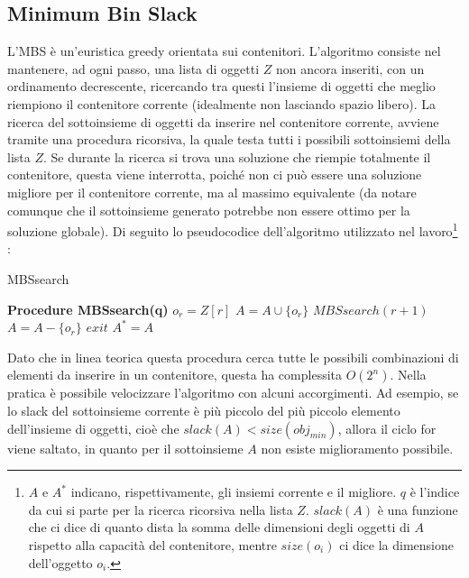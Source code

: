 \documentclass{article}
\begin{document}
\subsection{Minimum Bin Slack}
L'MBS è un'euristica greedy orientata sui contenitori. L'algoritmo consiste nel mantenere, ad ogni passo, una lista di oggetti $Z$ non ancora inseriti, con un ordinamento decrescente, ricercando tra questi l'insieme di oggetti che meglio riempiono il contenitore corrente (idealmente non lasciando spazio libero).
\newline
\newline
La ricerca del sottoinsieme di oggetti da inserire nel contenitore corrente, avviene tramite una procedura ricorsiva, la quale testa tutti i possibili sottoinsiemi della lista $Z$. Se durante la ricerca si trova una soluzione che riempie totalmente il contenitore, questa viene interrotta, poiché non ci può essere una soluzione migliore per il contenitore corrente, ma al massimo equivalente (da notare comunque che il sottoinsieme generato potrebbe non essere ottimo per la soluzione globale). 
\newpage
Di seguito lo pseudocodice dell'algoritmo utilizzato nel lavoro\footnote{$A$ e $A^*$ indicano, rispettivamente, gli insiemi corrente e il migliore. $q$ è l'indice da cui si parte per la ricerca ricorsiva nella lista $Z$. $slack(A)$ è una funzione che ci dice di quanto dista la somma delle dimensioni degli oggetti di $A$ rispetto alla capacità del contenitore, mentre $size(o_i)$ ci dice la dimensione dell'oggetto $o_i$.} :
\begin{algorithm}[h]
\caption{MBSsearch}
\label{MBSsearch}
\begin{algorithmic}[2]
\State \textbf{Procedure MBSsearch(q)}
\State $o_{r} = Z[r]$
\State $A = A \cup \{o_{r}\}$
\State $MBSsearch(r+1)$
\State $A = A - \{o_{r}\}$
\State $exit$
\EndIf
{}
\EndIf 
{}
\EndFor
{}
\State $A^* = A$
\EndIf
{}
\end{algorithmic}
\end{algorithm}
\newline
\newline
Dato che in linea teorica questa procedura cerca tutte le possibili combinazioni di elementi da inserire in un contenitore, questa ha complessita $O(2^n)$. Nella pratica è possibile velocizzare l'algoritmo con alcuni accorgimenti. Ad esempio, se lo slack del sottoinsieme corrente è più piccolo del più piccolo elemento dell'insieme di oggetti, cioè che $slack(A) < size(obj_{min})$, allora il ciclo for viene saltato, in quanto per il sottoinsieme $A$ non esiste miglioramento possibile.
\end{document}
